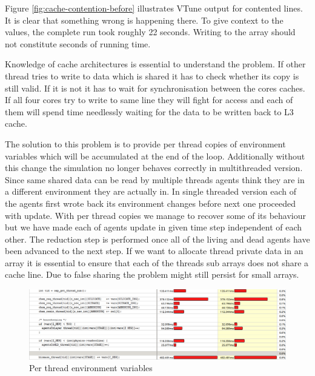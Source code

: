 \documentclass[12pt, a4paper]{report}
\begin{document}
Figure \ref{fig:cache-contention-before} illustrates VTune output for contented lines.
It is clear that something wrong is happening there. To give context to the
values, the complete run took roughly 22 seconds. Writing to the array
should not constitute seconds of running time.

Knowledge of cache architectures is essential to understand the problem. If
other thread tries to write to data which is shared it has to check whether
its copy is still valid. If it is not it has to wait for synchronisation
between the cores caches. If all four cores try to write to same line they
will fight for access and each of them will spend time needlessly waiting
for the data to be written back to L3 cache.

The solution to this problem is to provide per thread copies of environment
variables which will be accumulated at the end of the loop. Additionally
without this change the simulation no longer behaves correctly in multithreaded
version. Since same shared data can be read by multiple threads agents think
they are in a different environment they are actually in. In single threaded
version each of the agents first wrote back its environment changes before
next one proceeded with update. With per thread copies we manage to recover
some of its behaviour but we have made each of agents update in given time step
independent of each other. The reduction step is performed once all of the
living and dead agents have been advanced to the next step. If we want to
allocate thread private data in an array it is essential to ensure that each
of the threads sub arrays does not share a cache line. Due to false sharing the
problem might still persist for small arrays.

\begin{figure}[H]
  \begin{center}
    \includegraphics[width=\textwidth,natwidth=1174,natheight=321]{images/cache-cont-after.png}
    \caption{Per thread environment variables}
    \label{fig:cache-contention-after}
  \end{center}
\end{figure}
\end{document}

